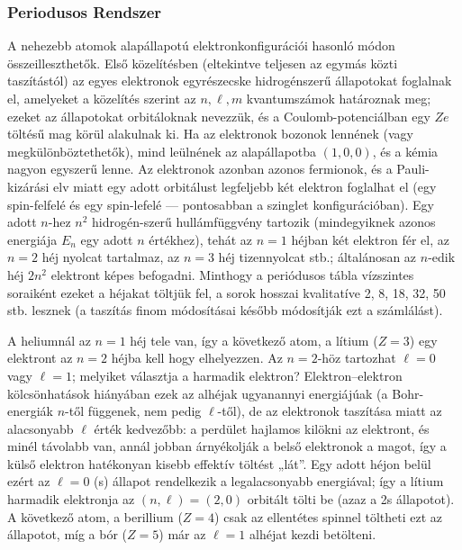 \documentclass[../main.tex]{subfiles}
\begin{document}
\subsubsection*{Periodusos Rendszer}
A nehezebb atomok alapállapotú elektronkonfigurációi hasonló módon összeilleszthetők. Első közelítésben (eltekintve teljesen az egymás közti taszítástól) az egyes elektronok egyrészecske hidrogénszerű állapotokat foglalnak el, amelyeket a közelítés szerint az $n,\ell,m$ kvantumszámok határoznak meg; ezeket az állapotokat orbitáloknak nevezzük, és a Coulomb-potenciálban egy $Ze$ töltésű mag körül alakulnak ki. Ha az elektronok bozonok lennének (vagy megkülönböztethetők), mind leülnének az alapállapotba $(1,0,0)$, és a kémia nagyon egyszerű lenne. Az elektronok azonban azonos fermionok, és a Pauli-kizárási elv miatt egy adott orbitálust legfeljebb két elektron foglalhat el (egy spin-felfelé és egy spin-lefelé — pontosabban a szinglet konfigurációban). Egy adott $n$-hez $n^2$ hidrogén-szerű hullámfüggvény tartozik (mindegyiknek azonos energiája $E_n$ egy adott $n$ értékhez), tehát az $n=1$ héjban két elektron fér el, az $n=2$ héj nyolcat tartalmaz, az $n=3$ héj tizennyolcat stb.; általánosan az $n$-edik héj $2n^2$ elektront képes befogadni. Minthogy a periódusos tábla vízszintes soraiként ezeket a héjakat töltjük fel, a sorok hosszai kvalitatíve 2, 8, 18, 32, 50 stb. lesznek (a taszítás finom módosításai később módosítják ezt a számlálást).

A heliumnál az $n=1$ héj tele van, így a következő atom, a lítium ($Z=3$) egy elektront az $n=2$ héjba kell hogy elhelyezzen. Az $n=2$-höz tartozhat $\ell=0$ vagy $\ell=1$; melyiket választja a harmadik elektron? Elektron–elektron kölcsönhatások hiányában ezek az alhéjak ugyanannyi energiájúak (a Bohr-energiák $n$-től függenek, nem pedig $\ell$-től), de az elektronok taszítása miatt az alacsonyabb $\ell$ érték kedvezőbb: a perdület hajlamos kilökni az elektront, és minél távolabb van, annál jobban árnyékolják a belső elektronok a magot, így a külső elektron hatékonyan kisebb effektív töltést „lát”. Egy adott héjon belül ezért az $\ell=0$ (s) állapot rendelkezik a legalacsonyabb energiával; így a lítium harmadik elektronja az $(n,\ell)=(2,0)$ orbitált tölti be (azaz a 2s állapotot). A következő atom, a berillium ($Z=4$) csak az ellentétes spinnel töltheti ezt az állapotot, míg a bór ($Z=5$) már az $\ell=1$ alhéjat kezdi betölteni.
\end{document}
